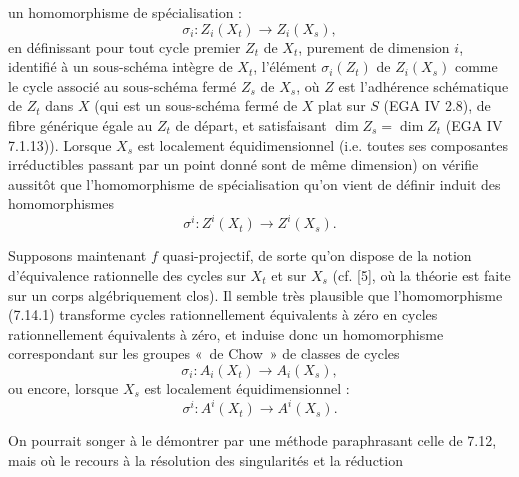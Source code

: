 
un homomorphisme de spécialisation :
\begin{equation}\tag{7.14.1}
  \sigma_i:Z_i(X_t)\longrightarrow Z_i(X_s),
\end{equation}
en définissant pour tout cycle premier \(Z_t\) de \(X_t\), purement de dimension \(i\), identifié à un sous-schéma intègre de \(X_t\), l'élément \(\sigma_i(Z_t)\) de \(Z_i(X_s)\) comme le cycle associé au sous-schéma fermé \(Z_s\) de \(X_s\), où \(Z\) est l'adhérence schématique de \(Z_t\) dans \(X\) (qui est un sous-schéma fermé de \(X\) plat sur \(S\) (EGA IV 2.8), de fibre générique égale au \(Z_t\) de départ, et satisfaisant \(\dim Z_s=\dim Z_t\) (EGA IV 7.1.13)). Lorsque \(X_s\) est localement équidimensionnel (i.e. toutes ses composantes irréductibles passant par un point donné sont de même dimension) on vérifie aussitôt que l'homomorphisme de spécialisation qu'on vient de définir induit des homomorphismes
\begin{equation}\tag{7.14.1 bis}
  \sigma^i:Z^i(X_t)\longrightarrow Z^i(X_s).
\end{equation}

Supposons maintenant \(f\) quasi-projectif, de sorte qu'on dispose de la notion d'équivalence rationnelle des cycles sur \(X_t\) et sur \(X_s\) (cf. [5], où la théorie est faite sur un corps algébriquement clos). Il semble très plausible que l'homomorphisme (7.14.1) transforme cycles rationnellement équivalents à zéro en cycles rationnellement équivalents à zéro, et induise donc un homomorphisme correspondant sur les groupes «~de Chow~» de classes de cycles
\begin{equation}\tag{7.14.2}
  \sigma_i:A_i(X_t)\longrightarrow A_i(X_s),
\end{equation}
ou encore, lorsque \(X_s\) est localement équidimensionnel :
\begin{equation}\tag{7.14.2 bis}
  \sigma^i:A^i(X_t)\longrightarrow A^i(X_s).
\end{equation}

On pourrait songer à le démontrer par une méthode paraphrasant celle de 7.12, mais où le recours à la résolution des singularités et la réduction
